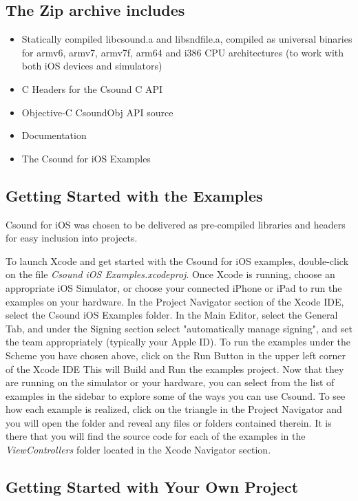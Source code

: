 \documentclass[11pt]{article}
\begin{document}
\subsection{The Zip archive includes}

\begin{itemize}
\item Statically compiled libcsound.a and libsndfile.a, compiled as universal binaries for armv6, armv7, armv7f, arm64 and i386 CPU architectures (to work with both iOS devices and simulators)
\item C Headers for the Csound C API
\item Objective-C CsoundObj API source
\item Documentation
\item The Csound for iOS Examples
\end{itemize}

\subsection{Getting Started with the Examples}

Csound for iOS was chosen to be delivered as pre-compiled libraries and headers for easy inclusion into projects.  

To launch Xcode and get started with the Csound for iOS examples, double-click on the file \textit{Csound iOS Examples.xcodeproj}. Once Xcode is running, choose an appropriate iOS Simulator, or choose your connected iPhone or iPad to run the examples on your hardware. In the Project Navigator section of the Xcode IDE, select the Csound iOS Examples folder.  In the Main Editor, select the General Tab, and under the Signing section select "automatically manage signing", and set the team appropriately (typically your Apple ID).  To run the examples under the Scheme you have chosen above, click on the Run Button in the upper left corner of the Xcode IDE  This will Build and Run the examples project.  Now that they are running on the simulator or your hardware, you can select from the list of examples in the sidebar to explore some of the ways you can use Csound. To see how each example is realized, click on the triangle in the Project Navigator and you will open the folder and reveal any files or folders contained therein. It is there that you will find the source code for each of the examples in the \textit{ViewControllers} folder located in the Xcode Navigator section.

\subsection{Getting Started with Your Own Project}
\end{document}
